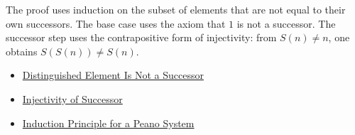 \begin{remark*}
The proof uses induction on the subset of elements that are not equal to
their own successors. The base case uses the axiom that $1$ is not a
successor. The successor step uses the contrapositive form of injectivity:
from $S(n)\neq n$, one obtains $S(S(n))\neq S(n)$.
\end{remark*}

\begin{dependencies}
\begin{itemize}
  \item \hyperref[ax:peano-base-not-successor]{Distinguished Element Is Not a Successor}
  \item \hyperref[ax:peano-successor-injective]{Injectivity of Successor}
  \item \hyperref[thm:induction-principle-for-peano-system]{Induction Principle for a Peano System}
\end{itemize}
\end{dependencies}


\clearpage
